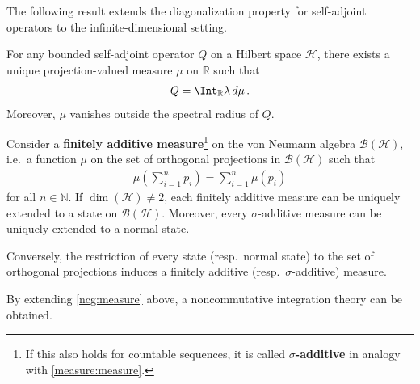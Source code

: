     The following result extends the diagonalization property for self-adjoint operators to the infinite-dimensional setting.
    \begin{result}[Diagonalization]\label{ncg:spectral_resolution}
        For any bounded self-adjoint operator $Q$ on a Hilbert space $\mathcal{H}$, there exists a unique projection-valued measure $\mu$ on $\mathbb{R}$ such that
        \begin{gather}
            Q = \Int_{\mathbb{R}}\lambda\,d\mu\,.
        \end{gather}
        Moreover, $\mu$ vanishes outside the spectral radius of $Q$.
    \end{result}

    \begin{theorem}[Gleason]
        Consider a \textbf{finitely additive measure}\footnote{If this also holds for countable sequences, it is called \textbf{$\sigma$-additive} in analogy with \cref{measure:measure}.} on the von Neumann algebra $\mathcal{B}(\mathcal{H})$, i.e.~a function $\mu$ on the set of orthogonal projections in $\mathcal{B}(\mathcal{H})$ such that
        \begin{gather}
            \mu\left(\sum_{i=1}^np_i\right) = \sum_{i=1}^n\mu(p_i)
        \end{gather}
        for all $n\in\mathbb{N}$. If $\dim(\mathcal{H})\neq2$, each finitely additive measure can be uniquely extended to a state on $\mathcal{B}(\mathcal{H})$. Moreover, every $\sigma$-additive measure can be uniquely extended to a normal state.

        Conversely, the restriction of every state (resp.~normal state) to the set of orthogonal projections induces a finitely additive (resp.~$\sigma$-additive) measure.
    \end{theorem}

    By extending \cref{ncg:measure} above, a noncommutative integration theory can be obtained.

